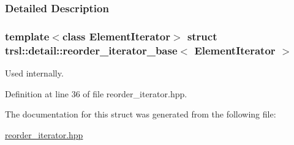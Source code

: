 \subsubsection{Detailed Description}
\subsubsection*{template$<$class ElementIterator$>$ struct trsl::detail::reorder\_\-iterator\_\-base$<$ ElementIterator $>$}

Used internally. 

Definition at line 36 of file reorder\_\-iterator.hpp.

The documentation for this struct was generated from the following file:\begin{DoxyCompactItemize}
\item 
\hyperlink{reorder__iterator_8hpp}{reorder\_\-iterator.hpp}\end{DoxyCompactItemize}

